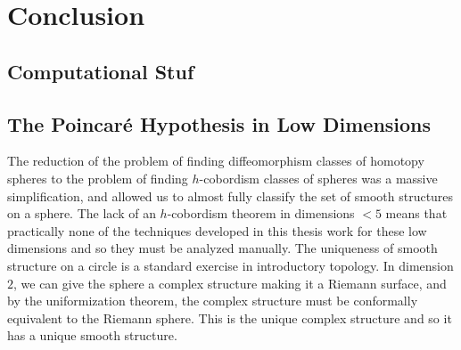 \chapter{Conclusion}

\begin{epigraph}{10em}{}
\end{epigraph}

\section{Computational Stuf}\label{sec:computational stuff}

\section{The Poincar\'e Hypothesis in Low Dimensions}

The reduction of the problem of finding diffeomorphism classes of homotopy spheres to the problem of finding $h$-cobordism classes of spheres was a massive simplification, and allowed us to almost fully classify the set of smooth structures on a sphere.
The lack of an $h$-cobordism theorem in dimensions $<5$ means that practically none of the techniques developed in this thesis work for these low dimensions and so they must be analyzed manually. The uniqueness of smooth structure on a circle is a standard exercise in introductory topology. In dimension $2$, we can give the sphere a complex structure making it a Riemann surface, and by the uniformization theorem, the complex structure must be conformally equivalent to the Riemann sphere. This is the unique complex structure and so it has a unique smooth structure.

